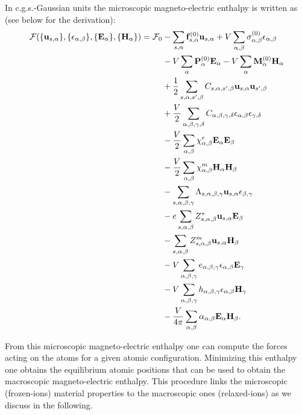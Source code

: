 \documentclass[12pt,a4paper]{article}
\begin{document}
\newpage
{\color{orange} In c.g.s.-Gaussian units the microscopic
magneto-electric enthalpy is written as (see below for the derivation):
\begin{align}
\mathcal{F}(\{{\bf u}_{s,\alpha}\}, \{\epsilon_{\alpha,\beta}\},
\{ {\bf E}_\alpha\}, \{{\bf H}_\alpha\})=\mathcal{F}_0 &-
\sum_{s,\alpha} {\bf f}^{(0)}_{s,\alpha} {\bf u}_{s,\alpha}+ 
V \sum_{\alpha,\beta}
\sigma^{(0)}_{\alpha,\beta} \epsilon_{\alpha,\beta} \nonumber \\ 
&- V \sum_{\alpha} {\bf P}^{(0)}_\alpha {\bf E}_\alpha - 
V \sum_{\alpha}
{\bf M}^{(0)}_\alpha {\bf H}_\alpha \nonumber \\
&+ {1\over 2}
\sum_{s,\alpha,s',\beta} C_{s,\alpha,s',\beta} {\bf u}_{s,\alpha}
{\bf u}_{s',\beta}\nonumber \\
&+ {V\over 2}\sum_{\alpha,\beta,\gamma,\delta} 
C_{\alpha,\beta,\gamma,\delta}  
\epsilon_{\alpha,\beta}
\epsilon_{\gamma,\delta} \nonumber \\
&- {V\over 2} \sum_{\alpha,\beta} 
\chi^e_{\alpha,\beta}
{\bf E}_{\alpha}
{\bf E}_{\beta} \nonumber \\
&- {V \over 2}  \sum_{\alpha,\beta} 
\chi^m_{\alpha,\beta}
{\bf H}_{\alpha}
{\bf H}_{\beta} \nonumber \\
&- \sum_{s,\alpha,\beta,\gamma}
\Lambda_{s,\alpha,\beta,\gamma} {\bf u}_{s,\alpha}
\epsilon_{\beta,\gamma}\nonumber \\
&- e\sum_{s,\alpha,\beta} Z^*_{s,\alpha,\beta} 
{\bf u}_{s,\alpha} {\bf E}_{\beta} \nonumber \\
&- \sum_{s,\alpha,\beta} 
Z^m_{s,\alpha,\beta} {\bf u}_{s,\alpha}{\bf H}_{\beta} \nonumber \\
&- V \sum_{\alpha,\beta,\gamma} e_{\alpha,\beta,\gamma} 
\epsilon_{\alpha,\beta} {\bf E}_{\gamma} \nonumber \\
&- V \sum_{\alpha,\beta,\gamma}  h_{\alpha,\beta,\gamma} 
\epsilon_{\alpha,\beta} {\bf H}_{\gamma} \nonumber \\
&- {V \over 4 \pi} \sum_{\alpha,\beta} 
\alpha_{\alpha,\beta} {\bf E}_{\alpha}
{\bf H}_{\beta}.
\end{align}
}

\newpage
From this microscopic magneto-electric enthalpy one can compute the forces
acting on the atoms for a given atomic configuration. Minimizing this
enthalpy one obtains the equilibrium atomic positions that can be used
to obtain the macroscopic magneto-electric enthalpy. This procedure
links the microscopic (frozen-ions) material properties to the
macroscopic ones (relaxed-ions) as we discuss in the following. 
\end{document}
